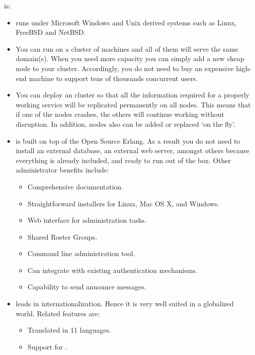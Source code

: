 \ejabberd{} is:
\begin{itemize}
\item {} \ejabberd{} runs under Microsoft Windows and Unix derived systems such as Linux, FreeBSD and NetBSD.

\item {} You can run \ejabberd{} on a cluster of machines and all of them will serve the same \Jabber{} domain(s). When you need more capacity you can simply add a new cheap node to your cluster. Accordingly, you do not need to buy an expensive high-end machine to support tens of thousands concurrent users.

\item {} You can deploy an \ejabberd{} cluster so that all the information required for a properly working service will be replicated permanently on all nodes. This means that if one of the nodes crashes, the others will continue working without disruption. In addition, nodes also can be added or replaced `on the fly'.

\item {} \ejabberd{} is built on top of the Open Source Erlang. As a result you do not need to install an external database, an external web server, amongst others because everything is already included, and ready to run out of the box. Other administrator benefits include:
\begin{itemize}
\item Comprehensive documentation.
\item Straightforward installers for Linux, Mac OS X, and Windows.\improved{}
\item Web interface for administration tasks.
\item Shared Roster Groups.
\item Command line administration tool.
\item Can integrate with existing authentication mechanisms.
\item Capability to send announce messages.
\end{itemize}

\item {} \ejabberd{} leads in internationalization. Hence it is very well suited in a globalized world. Related features are:
\begin{itemize}
\item Translated in 11 languages.
\item Support for .
\end{itemize}


\end{itemize}
